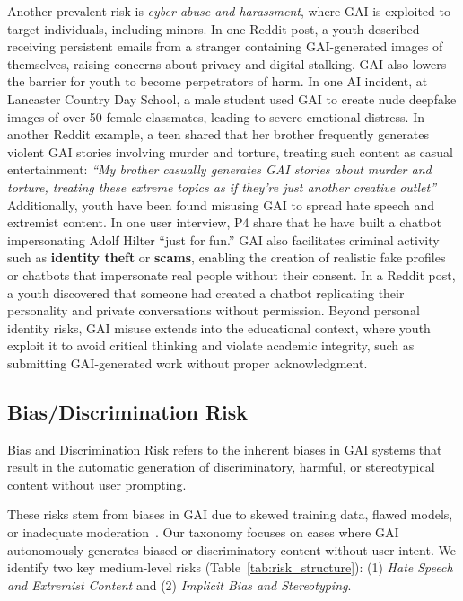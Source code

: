 Another prevalent risk is \textit{cyber abuse and harassment}, where GAI is exploited to target individuals, including minors. In one Reddit post, a youth described receiving persistent emails from a stranger containing GAI-generated images of themselves, raising concerns about privacy and digital stalking. GAI also lowers the barrier for youth to become perpetrators of harm. In one AI incident, at Lancaster Country Day School, a male student used GAI to create nude deepfake images of over 50 female classmates, leading to severe emotional distress. In another Reddit example, a teen shared that her brother frequently generates violent GAI stories involving murder and torture, treating such content as casual entertainment: \textit{``My brother casually generates GAI stories about murder and torture, treating these extreme topics as if they're just another creative outlet''} Additionally, youth have been found misusing GAI to spread hate speech and extremist content. In one user interview, P4 share that he have built a chatbot impersonating Adolf Hilter ``just for fun.''
GAI also facilitates criminal activity such as \textbf{identity theft} or \textbf{scams}, enabling the creation of realistic fake profiles or chatbots that impersonate real people without their consent. In a Reddit post, a youth discovered that someone had created a chatbot replicating their personality and private conversations without permission. Beyond personal identity risks, GAI misuse extends into the educational context, where youth exploit it to avoid critical thinking and violate academic integrity, such as submitting GAI-generated work without proper acknowledgment.

\vspace{-8pt}
\subsection{Bias/Discrimination Risk}
\begin{boxH}
Bias and Discrimination Risk refers to the inherent biases in GAI systems that result in the automatic generation of discriminatory, harmful, or stereotypical content without user prompting.
\end{boxH}
These risks stem from biases in GAI due to skewed training data, flawed models, or inadequate moderation~\cite{Roselli2019ManagingBI, ferrer2021bias, gallegos2024bias}. Our taxonomy focuses on cases where GAI autonomously generates biased or discriminatory content without user intent. We identify two key medium-level risks (Table~\ref{tab:risk_structure}): (1) \textit{Hate Speech and Extremist Content} and (2) \textit{Implicit Bias and Stereotyping}.

